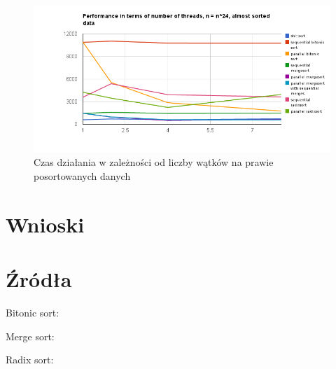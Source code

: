 \documentclass[11pt]{article}
\begin{document}
\begin{figure}[H]
\includegraphics[width=1.20\textwidth, height=0.35\textheight, left]{almost_sorted_data.png}
\caption{Czas działania w zależności od liczby wątków na prawie posortowanych danych}
\end{figure}

\section{Wnioski}

\section{Źródła}
Bitonic sort:


Merge sort:


Radix sort:

\end{document}

